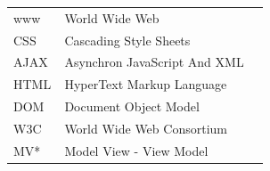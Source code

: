\documentclass[a4paper,bibtotoc,oneside]{scrbook}
\begin{document}








\listoffigures
{} %
\newpage


\hspace{-17mm}\begin{tabular}{>{\raggedleft}p{0.2\linewidth} p{0.75\linewidth} p{0.1\linewidth}}

www & World Wide Web\\
CSS & Cascading Style Sheets\\
AJAX & Asynchron JavaScript And XML\\
HTML & HyperText Markup Language\\
DOM & Document Object Model\\
W3C & World Wide Web Consortium\\
MV* & Model View - View Model\\

\end{tabular}


\end{document}
